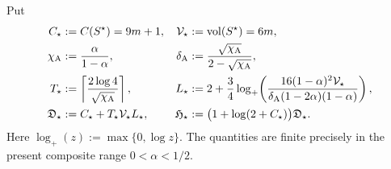 Put
\begin{align}
 C_\star&:=C(S^\star)=9m+1,
 &\mathcal V_\star&:=\operatorname{vol}(S^\star)=6m,
 \notag\\
 \chi_{\rm A}&:=\frac{\alpha}{1-\alpha},
 &\delta_{\rm A}&:=
   \frac{\sqrt{\chi_{\rm A}}}{2-\sqrt{\chi_{\rm A}}},
 \notag\\
 T_\star&:=\left\lceil
   \frac{2\log 4}{\sqrt{\chi_{\rm A}}}\right\rceil,
 &L_\star&:=2+\frac34\log_+\!\left(
   \frac{16(1-\alpha)^2\mathcal V_\star}
        {\delta_{\rm A}(1-2\alpha)(1-\alpha)}
                         \right),
 \label{eq:branch-caterpillar-envelope-aesp-parameters}\\
 \mathfrak D_\star&:=C_\star+T_\star\mathcal V_\star L_\star,
 &\mathfrak H_\star&:=
  \bigl(1+\log(2+C_\star)\bigr)\mathfrak D_\star.
 \label{eq:branch-caterpillar-envelope-aesp-budgets}
\end{align}
Here $\log_+(z):=\max\{0,\log z\}$.  The quantities are finite precisely in
the present composite range $0<\alpha<1/2$.

